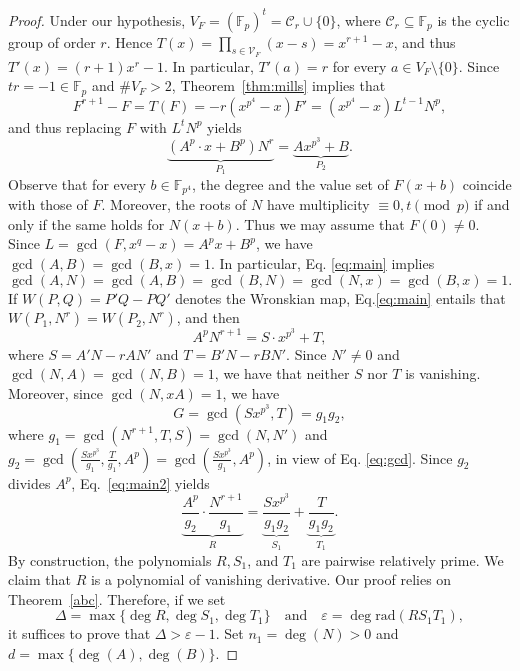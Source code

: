 \documentclass[11pt]{amsart}
\newcommand{\rad}{\mathrm{rad}}
\newcommand{\F}{\mathbb{F}}
\theoremstyle{definition}
\theoremstyle{remark}
\begin{document}
\begin{proof}
Under our hypothesis, $V_F=(\mathbb{F}_p)^t=\mathcal C_r\cup\{0\}$, where $\mathcal C_r\subseteq \F_{p}$ is the cyclic group of order $r$. Hence  $T(x)=\prod_{s\in \mathcal V_F}(x-s)=x^{r+1}-x$, and thus $T'(x)=(r+1)x^r-1$. In particular, $T'(a)=r$ for every $a\in V_F\setminus \{0\}$. Since $tr=-1\in \F_p$ and $\# V_F>2$, Theorem~\ref{thm:mills} implies that $$F^{r+1}-F=T(F)=-r(x^{p^4}-x)F'=(x^{p^4}-x)L^{t-1}N^p,$$ and thus replacing $F$ with  $L^tN^p$ yields
\begin{equation}\label{eq:main}\underbrace{(A^{p}\cdot x+B^{p})N^r}_{P_1}=\underbrace{Ax^{p^{3}}+B}_{P_2}.\end{equation}
Observe that for every $b\in \F_{p^4}$, the degree and the value set of $F(x+b)$ coincide with those  of $F$. Moreover, the roots of $N$ have multiplicity $\equiv 0, t\pmod p$ if and only if the same holds for $N(x+b)$. Thus we may assume that $F(0)\ne 0$. Since $L=\gcd(F, x^q-x)=A^px+B^p$, we have $\gcd(A, B)=\gcd(B, x)=1$. In particular, Eq. \eqref{eq:main} implies  \begin{equation}\label{eq:gcd}\gcd(A, N)=\gcd(A, B)=\gcd(B, N)=\gcd(N, x)=\gcd(B, x)=1.\end{equation} If $W(P, Q)=P'Q-PQ'$ denotes the Wronskian map, Eq.\eqref{eq:main} entails that $W(P_1, N^r)=W(P_2, N^r)$, and then
\begin{equation}\label{eq:main2} A^{p}N^{r+1}=S\cdot x^{p^{3}}+T,\end{equation}
where $S=A'N-rAN'$ and $T=B'N-rBN'$. 
Since $N'\neq 0$ and $\gcd(N,A)=\gcd(N,B)=1$, we have that neither $S$ nor $T$ is vanishing. Moreover, since  $\gcd(N,xA)=1$, we have  $$G=\gcd(S x^{p^{3}}, T)=g_1g_2,$$ where $g_1=\gcd(N^{r+1}, T, S)=\gcd(N, N')$ and $g_2=\gcd\left(\frac{Sx^{p^3}}{g_1}, \frac{T}{g_1}, A^p\right)=\gcd\left(\frac{Sx^{p^3}}{g_1}, A^p\right)$, in view of Eq. \eqref{eq:gcd}. Since $g_2$ divides $A^p$, Eq.~\eqref{eq:main2} yields
\begin{equation}\label{eq:main3}\underbrace{\frac{A^{p}}{g_2}\cdot\frac{N^{r+1}}{g_1} }_{R}=\underbrace{\frac{Sx^{p^{3}}}{g_1g_2}}_{S_1}+\underbrace{\frac{T}{g_1g_2}}_{T_1}.\end{equation} 
By construction, the polynomials $R, S_1$, and $T_1$ are pairwise relatively prime. We claim  that $R$ is a polynomial of vanishing derivative.
Our proof relies on Theorem~\ref{abc}.  Therefore, if we set  $$\Delta=\max\{\deg R, \deg S_1, \deg T_1 \}\quad\text{and}\quad \varepsilon=\deg \rad(RS_1T_1),$$
it suffices to prove that $\Delta>\varepsilon-1$. Set $n_1=\deg(N)>0$ and $d=\max\{\deg(A), \deg(B)\}$.

\end{proof}
\end{document}
